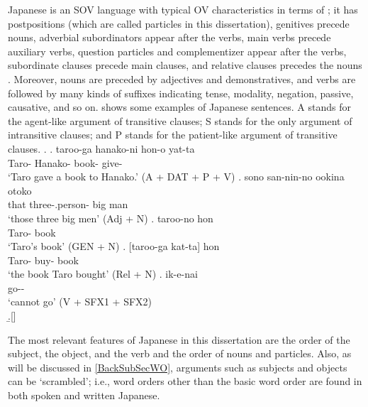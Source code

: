 Japanese is an SOV language with typical OV characteristics
in terms of ;
it has postpositions (which are called particles in this dissertation),
genitives precede nouns,
adverbial subordinators appear after the verbs,
main verbs precede auxiliary verbs,
question particles and complementizer appear after the verbs,
subordinate clauses precede main clauses, and
relative clauses precedes the nouns
\cite{shibatani90,masuokatakubo92}.
Moreover,
nouns are preceded by adjectives and demonstratives,
and verbs are followed by many kinds of suffixes indicating tense, modality, negation, passive, causative, and so on.
\Next shows some examples of Japanese sentences.
A stands for the agent-like argument of transitive clauses;
S stands for the only argument of intransitive clauses; and
P stands for the patient-like argument of transitive clauses.
%
\ex.
     \ag. taroo-ga hanako-ni hon-o yat-ta \\
        Taro- Hanako- book- give- \\
        `Taro gave a book to Hanako.' \hfill{(A + DAT + P + V)}
     \bg. sono san-nin-no ookina otoko \\
          that three-.person- big man \\
          `those three big men' \hfill{(Adj + N)}
     \bg. taroo-no hon \\
          Taro- book \\
          `Taro's book' \hfill{(GEN + N)}
     \bg. [taroo-ga kat-ta] hon \\
           Taro- buy- book \\
           `the book Taro bought' \hfill{(Rel + N)}
     \bg. ik-e-nai \\
          go-- \\
          `cannot go' \hfill{(V + SFX1 + SFX2)} \\
     \b.[] \hfill{\cite[pp.~257--258, glosses modified by the current author]{shibatani90}}

The most relevant features of Japanese in this dissertation are the order of the subject, the object, and the verb and the order of nouns and particles.
Also, as will be discussed in \ref{BackSubSecWO},
arguments such as subjects and objects can be `scrambled';
i.e., word orders other than the basic word order are found in both spoken and written Japanese.

